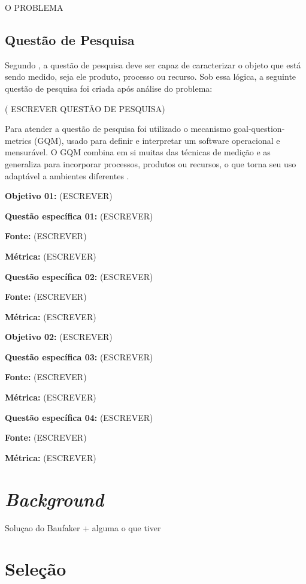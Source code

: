 O PROBLEMA


\subsection{Questão de Pesquisa}

Segundo , a questão de pesquisa deve ser capaz de caracterizar o objeto que está sendo medido, seja ele produto, processo ou recurso. Sob essa lógica, a seguinte questão de pesquisa foi criada após análise do problema:

( ESCREVER QUESTÃO DE PESQUISA)

Para atender a questão de pesquisa foi utilizado o mecanismo goal-question-metrics (GQM), usado para definir e interpretar um software operacional e mensurável. O GQM combina em si muitas das técnicas de medição e as generaliza para incorporar processos, produtos ou recursos, o que torna seu uso adaptável a ambientes diferentes \cite{caldiera_goal_1994}. 


\textbf{Objetivo 01:} (ESCREVER)

\textbf{Questão específica 01:} (ESCREVER)

\textbf{Fonte:} (ESCREVER)

\textbf{Métrica:} (ESCREVER)

\textbf{Questão específica 02:} (ESCREVER)

\textbf{Fonte:} (ESCREVER)

\textbf{Métrica:} (ESCREVER)

\textbf{Objetivo 02:} (ESCREVER)

\textbf{Questão específica 03:} (ESCREVER)

\textbf{Fonte:} (ESCREVER)

\textbf{Métrica:} (ESCREVER)


\textbf{Questão específica 04:} (ESCREVER)

\textbf{Fonte:} (ESCREVER)

\textbf{Métrica:} (ESCREVER)

\section{\textit{Background}}

Soluçao do Baufaker + alguma o que tiver

\section{Seleção}

